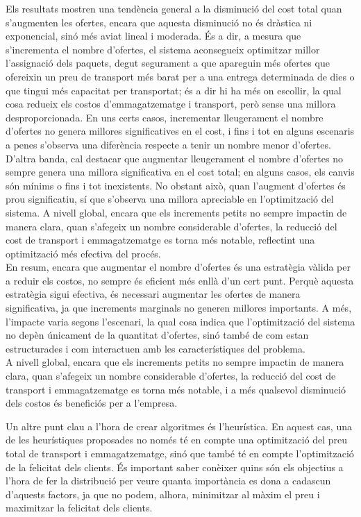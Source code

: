 \documentclass[a4paper]{article}
\begin{document}
\begin{table}[ht]
	Els resultats mostren una tendència general a la disminució del cost total quan s'augmenten les ofertes, encara que aquesta disminució no és dràstica ni exponencial, sinó més aviat lineal i moderada. És a dir, a mesura que s'incrementa el nombre d'ofertes, el sistema aconsegueix optimitzar millor l'assignació dels paquets, degut segurament a que apareguin més ofertes que ofereixin un preu de transport més barat per a una entrega determinada de dies o que tingui més capacitat per transportat; és a dir hi ha més on escollir, la qual cosa redueix els costos d'emmagatzematge i transport, però sense una millora desproporcionada. En uns certs casos, incrementar lleugerament el nombre d'ofertes no genera millores significatives en el cost, i fins i tot en alguns escenaris a penes s'observa una diferència respecte a tenir un nombre menor d'ofertes. \\
	
	D'altra banda, cal destacar que augmentar lleugerament el nombre d'ofertes no sempre genera una millora significativa en el cost total; en alguns casos, els canvis són mínims o fins i tot inexistents. No obstant això, quan l'augment d'ofertes és prou significatiu, sí que s'observa una millora apreciable en l'optimització del sistema. A nivell global, encara que els increments petits no sempre impactin de manera clara, quan s'afegeix un nombre considerable d'ofertes, la reducció del cost de transport i emmagatzematge es torna més notable, reflectint una optimització més efectiva del procés. \\
	
	En resum, encara que augmentar el nombre d'ofertes és una estratègia vàlida per a reduir els costos, no sempre és eficient més enllà d'un cert punt. Perquè aquesta estratègia sigui efectiva, és necessari augmentar les ofertes de manera significativa, ja que increments marginals no generen millores importants. A més, l'impacte varia segons l'escenari, la qual cosa indica que l'optimització del sistema no depèn únicament de la quantitat d'ofertes, sinó també de com estan estructurades i com interactuen amb les característiques del problema. \\
	
	A nivell global, encara que els increments petits no sempre impactin de manera clara, quan s'afegeix un nombre considerable d'ofertes, la reducció del cost de transport i emmagatzematge es torna més notable, i a més qualsevol disminució dels costos és beneficiós per a l'empresa.
	
	Un altre punt clau a l'hora de crear algoritmes és l'heurística. En aquest cas, una de les heurístiques proposades no només té en compte una optimització del preu total de transport i emmagatzematge, sinó que també té en compte l'optimització de la felicitat dels clients. És important saber conèixer quins són els objectius a l'hora de fer la distribució per veure quanta importància es dona a cadascun d'aquests factors, ja que no podem, alhora, minimitzar al màxim el preu i maximitzar la felicitat dels clients. \\

\end{table}
\end{document}

